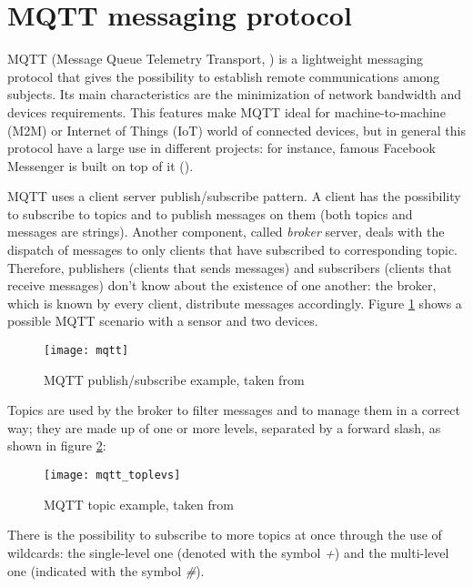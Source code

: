 \section{MQTT messaging protocol}\label{mqtt}

MQTT (Message Queue Telemetry Transport, \cite{banks2014mqtt}) is a light\-weight messaging protocol that gives the possibility to establish remote communications among subjects. Its main characteristics are the minimization of network bandwidth and devices requirements. This features make MQTT ideal for machine-to-machine (M2M) or Internet of Things (IoT) world of connected devices, but in general this protocol have a large use in different projects: for instance, famous Facebook Messenger is built on top of it (\cite{zhang2011building}).

MQTT uses a client server publish\slash{}subscribe pattern. A client has the possibility to subscribe to topics and to publish messages on them (both topics and messages are strings). Another component, called \textit{broker} server, deals with the dispatch of messages to only clients that have subscribed to corresponding topic. Therefore, publishers (clients that sends messages) and subscribers (clients that receive messages) don't know about the existence of one another: the broker, which is known by every client, distribute messages accordingly. Figure \ref{fig::mqtt_example} shows a possible MQTT scenario with a sensor and two devices.

\begin{figure}[H]

    \centering
    \texttt{[image: mqtt]}
    \caption{MQTT publish/subscribe example, taken from \cite{site:hivemq}}
    \label{fig::mqtt_example}

\end{figure}

Topics are used by the broker to filter messages and to manage them in a correct way; they are made up of one or more levels, separated by a forward slash, as shown in figure \ref{fig::topic}:

\begin{figure}[H]

    \centering
    \texttt{[image: mqtt\_toplevs]}
    \caption{MQTT topic example, taken from \cite{site:hivemq}}
    \label{fig::topic}

\end{figure}

There is the possibility to subscribe to more topics at once through the use of wildcards: the single-level one (denoted with the symbol \textit{+}) and the multi-level one (indicated with the symbol \textit{\#}).

